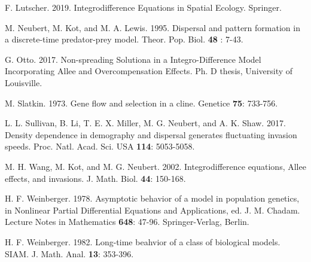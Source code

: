 \documentclass[11pt]{article}
\theoremstyle{definition}
\numberwithin{equation}{section}
\numberwithin{thm}{section}
\begin{document}
\begin{thebibliography}{9}
F. Lutscher. 2019. Integrodifference Equations in Spatial Ecology.  Springer.


 M. Neubert, M. Kot, and M. A. Lewis. 1995. Dispersal and pattern formation in a
discrete-time predator-prey model. Theor. Pop. Biol. {\bf 48}
: 7-43.

 G. Otto. 2017. Non-spreading Solutiona in a Integro-Difference Model Incorporating Allee and Overcompensation Effects. Ph. D thesis, University of Louisville.

 M. Slatkin. 1973. Gene flow and selection in a cline.
Genetice {\bf 75}: 733-756.



 L. L. Sullivan, B. Li, T. E. X. Miller, M. G. Neubert, and A. K. Shaw. 2017.
Density dependence in demography and dispersal generates fluctuating invasion speeds. Proc. Natl. Acad. Sci. USA {\bf
114}: 5053-5058.


 M. H. Wang, M. Kot, and M. G. Neubert. 2002. Integrodifference equations, Allee effects, and
invasions. J. Math. Biol. {\bf 44}: 150-168.

 H. F. Weinberger. 1978. Asymptotic behavior of a model in  population genetics,
in Nonlinear Partial Differential Equations  and Applications, ed.
J. M. Chadam. Lecture Notes in Mathematics {\bf 648}: 47-96.
Springer-Verlag, Berlin.

 H. F.  Weinberger. 1982. Long-time beahvior of a class of biological models. SIAM. J.
Math. Anal. {\bf 13}: 353-396.

\end{thebibliography}
\end{document}
